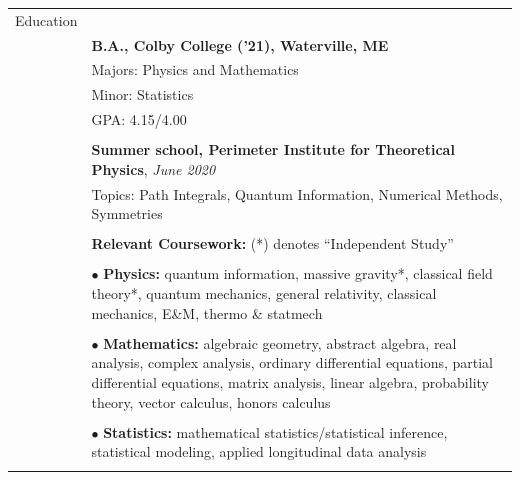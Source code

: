 \documentclass[10pt]{article}
\begin{document}
\noindent \begin{longtable}{ l m{14.5cm}   }

	
  \large{Education}    	& \\ 
  						& \textbf{B.A., Colby College ('21), Waterville, ME} \\
     				 	& Majors: Physics and Mathematics \\
     				 	& Minor: Statistics  \\
     					& GPA: 4.15/4.00 \\
	 					& \\
	 					
	 					&\textbf{Summer school, Perimeter Institute for Theoretical Physics}, \textit{June 2020} \\
	 					& Topics: Path Integrals, Quantum Information, Numerical Methods, Symmetries \\
	 					&\\
	 					
	 					& \textbf{Relevant Coursework:} (*) denotes ``Independent Study'' \\ \vspace{-12pt}
	 					& \\
	 					& $\bullet$ \textbf{Physics:} quantum information, massive gravity*, classical field theory*, quantum mechanics,  general relativity, classical mechanics, E\&M, thermo \& statmech\\  \vspace{-9pt}
	 					& \\
	 					& $\bullet$ \textbf{Mathematics:} algebraic geometry, abstract algebra, real analysis, complex analysis, ordinary differential equations, partial differential equations, matrix analysis, linear algebra, probability theory, vector calculus, honors calculus\\   \vspace{-9pt}
	 					& \\ 
	 					& $\bullet$ \textbf{Statistics:} mathematical statistics/statistical inference,  statistical modeling, applied longitudinal data analysis\\
	 					& \\
    

\end{longtable}
\end{document}
